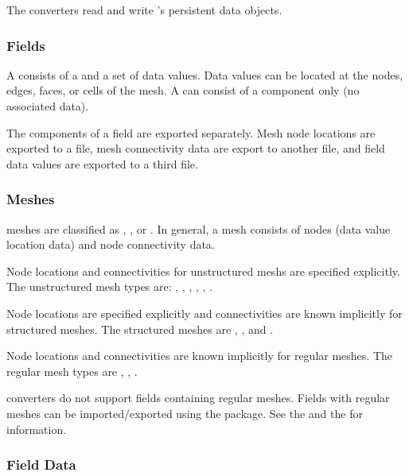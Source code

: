 The converters read and write \sr{}'s persistent data objects.

\subsubsection{Fields}

A \sr{}  consists of a  and a set of
data values.  Data values can be located at the nodes, edges, faces,
or cells of the mesh.  A  can consist of a
 component only (no associated data).

The components of a field are exported separately.  Mesh node
locations are exported to a file, mesh connectivity data are export to
another file, and field data values are exported to a third file.


\subsubsection{Meshes}

\sr{} meshes are classified as , , or
.  In general, a mesh consists of nodes (data value location
data) and node connectivity data.

Node locations and connectivities for unstructured meshs are specified
explicitly.  The unstructured mesh types are:
, ,
, ,
, .

Node locations are specified explicitly and connectivities are known
implicitly for structured meshes.  The structured meshes are
, , and
.

Node locations and connectivities are known implicitly for regular
meshes.  The regular mesh types are ,
, .

\sr{} converters do not support fields containing regular meshes.
Fields with regular meshes can be imported/exported using the
 package.  See the  and
the 
for information.


\subsubsection{Field Data}

